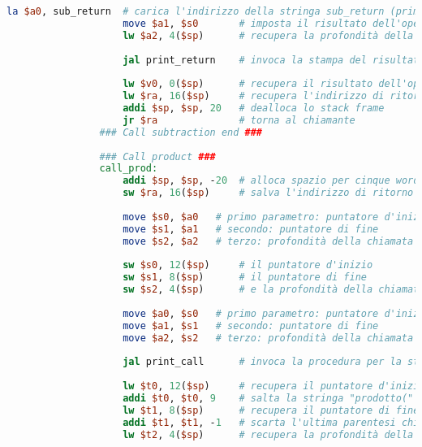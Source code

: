 \begin{center}
\begin{lstlisting}[language=mips, gobble=14, stepnumber=1]
                    la $a0, sub_return  # carica l'indirizzo della stringa sub_return (primo parametro)
                    move $a1, $s0       # imposta il risultato dell'operazione come secondo parametro
                    lw $a2, 4($sp)      # recupera la profondità della chiamata (terzo parametro)
                    
                    jal print_return    # invoca la stampa del risultato con questi tre parametri
                    
                    lw $v0, 0($sp)      # recupera il risultato dell'operazione
                    lw $ra, 16($sp)     # recupera l'indirizzo di ritorno
                    addi $sp, $sp, 20   # dealloca lo stack frame
                    jr $ra              # torna al chiamante
                ### Call subtraction end ###
                
                ### Call product ###
                call_prod:
                    addi $sp, $sp, -20  # alloca spazio per cinque words nello stack frame
                    sw $ra, 16($sp)     # salva l'indirizzo di ritorno nello stack
                    
                    move $s0, $a0   # primo parametro: puntatore d'inizio
                    move $s1, $a1   # secondo: puntatore di fine
                    move $s2, $a2   # terzo: profondità della chiamata
                    
                    sw $s0, 12($sp)     # il puntatore d'inizio
                    sw $s1, 8($sp)      # il puntatore di fine
                    sw $s2, 4($sp)      # e la profondità della chiamata
                    
                    move $a0, $s0   # primo parametro: puntatore d'inizio
                    move $a1, $s1   # secondo: puntatore di fine
                    move $a2, $s2   # terzo: profondità della chiamata
                    
                    jal print_call      # invoca la procedura per la stampa dell'invocazione (con gli stessi parametri)
                    
                    lw $t0, 12($sp)     # recupera il puntatore d'inizio dallo stack
                    addi $t0, $t0, 9    # salta la stringa "prodotto(" (9 caratteri)
                    lw $t1, 8($sp)      # recupera il puntatore di fine
                    addi $t1, $t1, -1   # scarta l'ultima parentesi chiusa
                    lw $t2, 4($sp)      # recupera la profondità della chiamata
                    

\end{lstlisting}
\end{center}
